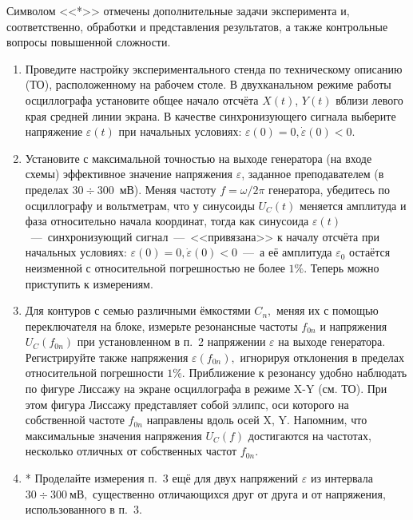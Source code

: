 \begin{lab:task}
Символом <<*>> отмечены дополнительные задачи эксперимента и, соответственно, обработки и представления результатов, а также контрольные вопросы повышенной сложности.
	\begin{enumerate}
    \item Проведите настройку экспериментального стенда по техническому описанию (ТО), расположенному на рабочем столе. В двухканальном режиме работы осциллографа установите общее начало отсчёта $X(t)$, $Y(t)$ вблизи левого края средней линии экрана. В качестве синхронизующего сигнала выберите напряжение $\varepsilon(t)$ при начальных условиях: $\varepsilon(0)=0, \dot{\varepsilon}(0)<0.$

    \item Установите с максимальной точностью на выходе генератора (на входе схемы) эффективное значение напряжения $\varepsilon$, заданное преподавателем (в пределах $30\div300$~мВ). Меняя частоту $f=\omega/2\pi$ генератора, убедитесь по осциллографу и вольтметрам, что у синусоиды $U_C(t)$ меняется амплитуда и фаза относительно начала координат, тогда как синусоида $\varepsilon(t)$~---~синхронизующий сигнал~---~<<привязана>> к началу отсчёта при начальных условиях: $\varepsilon(0)=0, \dot{\varepsilon}(0)<0$~---~а её амплитуда $\varepsilon_0$ остаётся неизменной с относительной погрешностью не более $1\%$. Теперь можно приступить к измерениям.

    \item Для контуров с семью различными ёмкостями $C_n,$ меняя их с помощью переключателя на блоке, измерьте резонансные частоты $f_{0n}$ и напряжения $U_C(f_{0n})$ при установленном в п.~2 напряжении $\varepsilon$ на выходе генератора. Регистрируйте также напряжения $\varepsilon(f_{0n}),$ игнорируя отклонения в пределах относительной погрешности $1\%$. Приближение к резонансу удобно наблюдать по фигуре Лиссажу на экране осциллографа в режиме X-Y (см. ТО). При этом фигура Лиссажу представляет собой эллипс, оси которого на собственной частоте $f_{0n}$ направлены вдоль осей X, Y. Напомним, что максимальные значения напряжения $U_C(f)$ достигаются на частотах, несколько отличных от собственных частот $f_{0n}.$

    \item * Проделайте измерения п.~3 ещё для двух напряжений $\varepsilon$ из интервала $30\div 300~мВ,$ существенно отличающихся друг от друга и от напряжения, использованного в п.~3.


\end{enumerate}
\end{lab:task}
